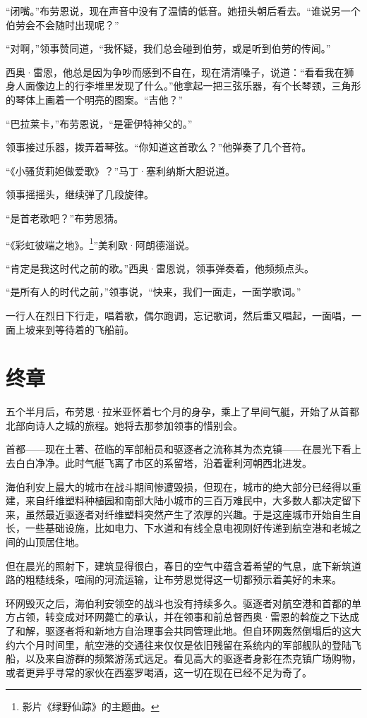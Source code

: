\documentclass[AutoFakeBold=true]{book}
\begin{document}
``闭嘴。''布劳恩说，现在声音中没有了温情的低音。她扭头朝后看去。``谁说另一个伯劳会不会随时出现呢？''

``对啊，''领事赞同道，``我怀疑，我们总会碰到伯劳，或是听到伯劳的传闻。''

西奥·雷恩，他总是因为争吵而感到不自在，现在清清嗓子，说道：``看看我在狮身人面像边上的行李堆里发现了什么。''他拿起一把三弦乐器，有个长琴颈，三角形的琴体上画着一个明亮的图案。``吉他？''

``巴拉莱卡，''布劳恩说，``是霍伊特神父的。''

领事接过乐器，拨弄着琴弦。``你知道这首歌么？''他弹奏了几个音符。

``《小骚货莉妲做爱歌》？''马丁·塞利纳斯大胆说道。

领事摇摇头，继续弹了几段旋律。

``是首老歌吧？''布劳恩猜。

``《彩虹彼端之地》。\footnote{影片《绿野仙踪》的主题曲。}''美利欧·阿朗德淄说。

``肯定是我这时代之前的歌。''西奥·雷恩说，领事弹奏着，他频频点头。

``是所有人的时代之前，''领事说，``快来，我们一面走，一面学歌词。''

一行人在烈日下行走，唱着歌，偶尔跑调，忘记歌词，然后重又唱起，一面唱，一面上坡来到等待着的飞船前。

\chapter*{终章}

五个半月后，布劳恩·拉米亚怀着七个月的身孕，乘上了早间气艇，开始了从首都北部向诗人之城的旅程。她将去那参加领事的惜别会。

首都——现在土著、莅临的军部船员和驱逐者之流称其为杰克镇——在晨光下看上去白白净净。此时气艇飞离了市区的系留塔，沿着霍利河朝西北进发。

海伯利安上最大的城市在战斗期间惨遭毁损，但现在，城市的绝大部分已经得以重建，来自纤维塑料种植园和南部大陆小城市的三百万难民中，大多数人都决定留下来，虽然最近驱逐者对纤维塑料突然产生了浓厚的兴趣。于是这座城市开始自生自长，一些基础设施，比如电力、下水道和有线全息电视刚好传递到航空港和老城之间的山顶居住地。

但在晨光的照射下，建筑显得很白，春日的空气中蕴含着希望的气息，底下新筑道路的粗糙线条，喧闹的河流运输，让布劳恩觉得这一切都预示着美好的未来。

环网毁灭之后，海伯利安领空的战斗也没有持续多久。驱逐者对航空港和首都的单方占领，转变成对环网薨亡的承认，并在领事和前总督西奥·雷恩的斡旋之下达成了和解，驱逐者将和新地方自治理事会共同管理此地。但自环网轰然倒塌后的这大约六个月时间里，航空港的交通往来仅仅是依旧残留在系统内的军部舰队的登陆飞船，以及来自游群的频繁游荡式远足。看见高大的驱逐者身影在杰克镇广场购物，或者更异乎寻常的家伙在西塞罗喝酒，这一切在现在已经不足为奇了。
\end{document}
